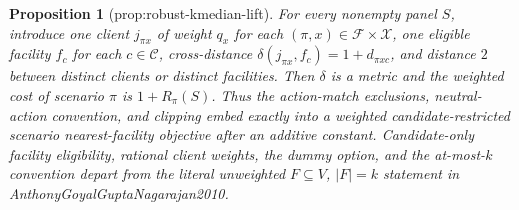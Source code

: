 \documentclass{article}
\newtheorem{proposition}{Proposition}
\begin{document}
\begin{proposition}[prop:robust-kmedian-lift]\label{prop:robust-kmedian-lift}
For every nonempty panel \(S\), introduce one client \(j_{\pi x}\) of weight \(q_x\) for each \((\pi,x)\in\mathcal F\times\mathcal X\), one eligible facility \(f_c\) for each \(c\in\mathcal C\), cross-distance \(\delta(j_{\pi x},f_c)=1+d_{\pi xc}\), and distance \(2\) between distinct clients or distinct facilities. Then \(\delta\) is a metric and the weighted cost of scenario \(\pi\) is \(1+R_{\pi}(S)\). Thus the action-match exclusions, neutral-action convention, and clipping embed exactly into a weighted candidate-restricted scenario nearest-facility objective after an additive constant. Candidate-only facility eligibility, rational client weights, the dummy option, and the at-most-\(k\) convention depart from the literal unweighted \(F\subseteq V\), \(|F|=k\) statement in AnthonyGoyalGuptaNagarajan2010.
\end{proposition}
\end{document}
